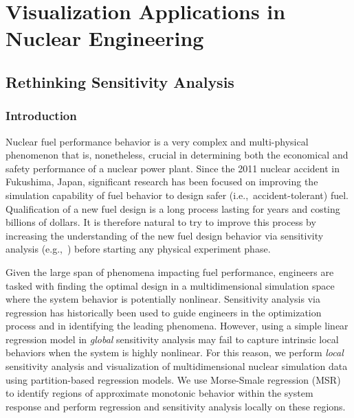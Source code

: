 
\chapter{Visualization Applications in Nuclear Engineering}
\label{ch:visualization}
\section{Rethinking Sensitivity Analysis}
\label{paper:pacificVis2016}


\subsection{Introduction}
\label{sec:saIntroduction}
Nuclear fuel performance behavior is a very complex and multi-physical phenomenon that is, nonetheless, crucial in determining both the economical and safety performance of a nuclear power plant.
%
Since the 2011 nuclear accident in Fukushima, Japan, significant research has been focused on improving the simulation capability of fuel behavior to design safer (i.e.,\ accident-tolerant) fuel.
%
Qualification of a new fuel design is a long process lasting for years and costing billions of dollars.
%
It is therefore natural to try to improve this process by increasing the understanding of the new fuel design behavior via sensitivity analysis (e.g.,~\cite{IkonenTulkki2014,PastoreSwilerHales2015}) before starting any physical experiment phase.

Given the large span of phenomena impacting fuel performance, engineers are tasked with finding the optimal design in a multidimensional simulation space where the system behavior is potentially nonlinear.
%
Sensitivity analysis via regression has historically been used to guide engineers in the optimization process and in identifying the leading phenomena.
%
However, using a simple linear regression model in \emph{global} sensitivity analysis may fail to capture intrinsic local behaviors when the system is highly nonlinear.
%
For this reason, we perform \emph{local} sensitivity analysis and visualization of multidimensional nuclear simulation data using partition-based regression models.
%
We use Morse-Smale regression (MSR)~\cite{GerberRubelBremer2011} to identify regions of approximate monotonic behavior within the system response and perform regression and sensitivity analysis locally on these regions.

